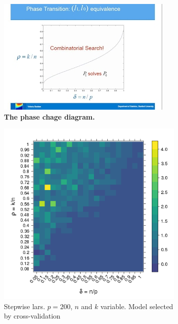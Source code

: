 \documentclass[10pt,letterpaper]{article}
\begin{document}
\begin{figure}[tbhp] 
 \begin{adjustwidth}{-1.00in}{0in}
  \begin{subfigure}[b]{0.4\linewidth}
    \centering
   \includegraphics[totalheight=6cm]{./figs/phase-diagram-equivalence.png} 
\caption{{\bf The phase chage diagram.}}
\label{figure:phase-diagram-equivalence.png} 
    \vspace{4ex}
  \end{subfigure} 
  \begin{subfigure}[b]{0.6\linewidth}
    \centering
  \includegraphics[totalheight=6cm]{./figs/stepwise_lars_cv.png}
\caption{Stepwise lars. $p=200$, $n$ and $k$ variable. Model selected by cross-validation
}
\label{figure:stepwise_lars_cv.png}
  \end{subfigure} 
  \caption{}
\end{adjustwidth}
\end{figure}
\end{document}
